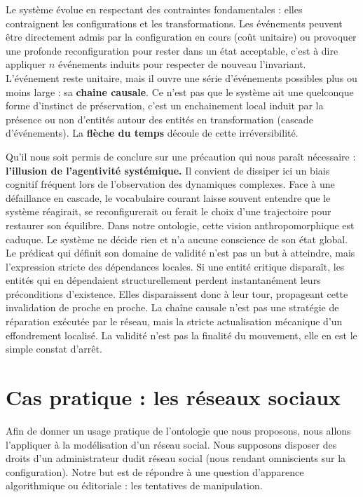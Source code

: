 \documentclass{report}
\begin{document}
		
		Le système évolue en respectant des contraintes fondamentales : elles contraignent les configurations et les transformations. Les événements peuvent être directement admis par la configuration en cours (coût unitaire) ou provoquer une profonde reconfiguration pour rester dans un état acceptable, c'est à dire appliquer $n$ événements induits pour respecter de nouveau l'invariant. L'événement reste unitaire, mais il ouvre une série d'événements possibles plus ou moins large : sa \textbf{chaine causale}. Ce n'est pas que le système ait une quelconque forme d'instinct de préservation, c'est un enchainement local induit par la présence ou non d'entités autour des entités en transformation (cascade d'événements). La \textbf{flèche du temps} découle de cette irréversibilité.
		
		\vspace{0.5cm}
		
		Qu'il nous soit permis de conclure sur une précaution qui nous paraît nécessaire : \textbf{l'illusion de l'agentivité systémique.} Il convient de dissiper ici un biais cognitif fréquent lors de l'observation des dynamiques complexes. Face à une défaillance en cascade, le vocabulaire courant laisse souvent entendre que le système \og{}réagirait\fg{}, \og{}se reconfigurerait\fg{} ou \og{}ferait le choix\fg{} d'une trajectoire pour restaurer son équilibre. Dans notre ontologie, cette vision anthropomorphique est caduque. Le système ne décide rien et n'a aucune conscience de son état global. Le prédicat qui définit son domaine de validité n'est pas un but à atteindre, mais l'expression stricte des dépendances locales. Si une entité critique disparaît, les entités qui en dépendaient structurellement perdent instantanément leurs préconditions d'existence. Elles disparaissent donc à leur tour, propageant cette invalidation de proche en proche. La chaîne causale n'est pas une stratégie de réparation exécutée par le réseau, mais la stricte actualisation mécanique d'un effondrement localisé. La validité n'est pas la finalité du mouvement, elle en est le simple constat d'arrêt.
		
		
	\chapter{Cas pratique : les réseaux sociaux}
	
	
	Afin de donner un usage pratique de l'ontologie que nous proposons, nous allons l'appliquer à la modélisation d'un réseau social. Nous supposons disposer des droits d'un administrateur dudit réseau social (nous rendant omniscients sur la configuration). Notre but est de répondre à une question d'apparence algorithmique ou éditoriale : les tentatives de manipulation.
	
\end{document}
